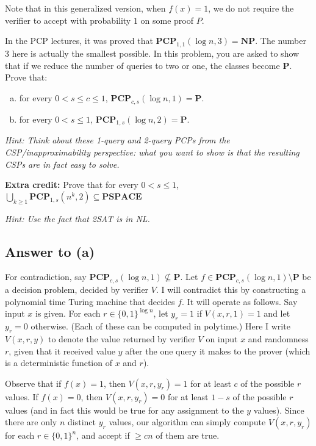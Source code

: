 \documentclass{article}
\renewcommand{\P}{\mathbf{P}}
\newcommand{\mf}[1]{\mathbf{#1}}
\begin{document}
Note that in this generalized version, when $f(x) = 1$, we do not require the verifier to accept with probability $1$ on some proof $P$. 

In the PCP lectures, it was proved that $\mf{PCP}_{1,1}(\log n, 3)=\mathbf{NP}$. The number $3$ here is actually the smallest possible. In this problem, you are asked to show that if we reduce the number of queries to two or one, the classes become $\mathbf{P}$. Prove that:
\begin{enumerate}[(a)]
	\item
	for every $0<s\leq  c\leq 1$, $\mf{PCP}_{c,s}(\log n,1)=\mathbf{P}$.
	\item
	for every $0<s\leq 1$, $\mf{PCP}_{1,s}(\log n,2)=\mathbf{P}$.
\end{enumerate} 
\emph{Hint: Think about these 1-query and 2-query PCPs from the CSP/inapproximability perspective: what you want to show is that the resulting CSPs are in fact easy to solve.}

\smallskip

{\bf Extra credit:} Prove that for every $0<s\leq 1$, $\bigcup_{k \geq 1} \mf{PCP}_{1,s}(n^k,2) \subseteq \mf{PSPACE}$

\smallskip

\emph{Hint: Use the fact that 2SAT is in NL.} 

\newpage
\subsection*{Answer to (a)}
For contradiction, say $\mathbf{PCP}_{c, s}(\log n, 1) \not\subseteq \P$.
Let $f \in \mathbf{PCP}_{c, s}(\log n, 1) \setminus \P$ be a decision problem,
decided by verifier $V$.
I will contradict this by constructing a polynomial time Turing machine that decides $f$.
It will operate as follows.  Say input $x$ is given.
For each $r \in \{0, 1\}^{\log n}$, let $y_r = 1$ if $V(x, r, 1) = 1$ and let $y_r = 0$ otherwise. (Each of these can be computed in polytime.) Here I write $V(x, r, y)$ to denote the value returned by verifier $V$ on input $x$ and randomness $r$, given that it received value $y$ after the one query it makes to the prover (which is a deterministic function of $x$ and $r$).

Observe that if $f(x) = 1$, then $V(x, r, y_r) = 1$ for at least $c$ of the possible $r$ values.
If $f(x) = 0$, then $V(x, r, y_r) = 0$ for at least $1 - s$ of the possible $r$ values (and in fact this would be true for any assignment to the $y$ values).
Since there are only $n$ distinct $y_r$ values, our algorithm can simply compute $V(x, r, y_r)$ for each $r \in \{0, 1\}^n$, and accept if $\geq cn$ of them are true.
\end{document}
